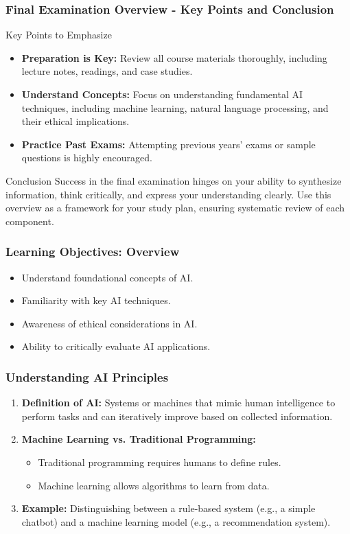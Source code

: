 \documentclass[aspectratio=169]{beamer}
\begin{document}
\begin{frame}[fragile]
    \frametitle{Final Examination Overview - Key Points and Conclusion}
    \begin{block}{Key Points to Emphasize}
        \begin{itemize}
            \item \textbf{Preparation is Key:} Review all course materials thoroughly, including lecture notes, readings, and case studies.
            \item \textbf{Understand Concepts:} Focus on understanding fundamental AI techniques, including machine learning, natural language processing, and their ethical implications.
            \item \textbf{Practice Past Exams:} Attempting previous years’ exams or sample questions is highly encouraged.
        \end{itemize}
    \end{block}
    
    \begin{block}{Conclusion}
        Success in the final examination hinges on your ability to synthesize information, think critically, and express your understanding clearly. Use this overview as a framework for your study plan, ensuring systematic review of each component.
    \end{block}
\end{frame}

\begin{frame}[fragile]
    \frametitle{Learning Objectives: Overview}
    \begin{itemize}
        \item Understand foundational concepts of AI.
        \item Familiarity with key AI techniques.
        \item Awareness of ethical considerations in AI.
        \item Ability to critically evaluate AI applications.
    \end{itemize}
\end{frame}

\begin{frame}[fragile]
    \frametitle{Understanding AI Principles}
    \begin{enumerate}
        \item \textbf{Definition of AI:} Systems or machines that mimic human intelligence to perform tasks and can iteratively improve based on collected information.
        \item \textbf{Machine Learning vs. Traditional Programming:}
        \begin{itemize}
            \item Traditional programming requires humans to define rules.
            \item Machine learning allows algorithms to learn from data.
        \end{itemize}
        \item \textbf{Example:} Distinguishing between a rule-based system (e.g., a simple chatbot) and a machine learning model (e.g., a recommendation system).
    \end{enumerate}
\end{frame}
\end{document}
